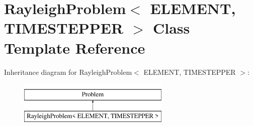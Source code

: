 \hypertarget{classRayleighProblem}{}\section{Rayleigh\+Problem$<$ E\+L\+E\+M\+E\+NT, T\+I\+M\+E\+S\+T\+E\+P\+P\+ER $>$ Class Template Reference}
\label{classRayleighProblem}
Inheritance diagram for Rayleigh\+Problem$<$ E\+L\+E\+M\+E\+NT, T\+I\+M\+E\+S\+T\+E\+P\+P\+ER $>$\+:\begin{figure}[H]
\begin{center}
\leavevmode
\includegraphics[height=2.000000cm]{classRayleighProblem}
\end{center}
\end{figure}
